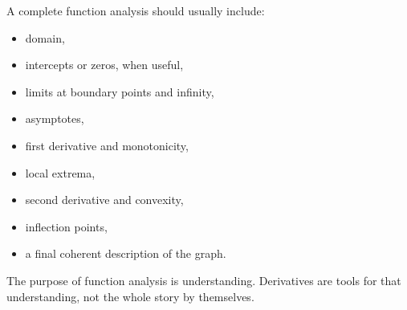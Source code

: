 \begin{summarybox}
A complete function analysis should usually include:
\begin{itemize}
\item domain,
\item intercepts or zeros, when useful,
\item limits at boundary points and infinity,
\item asymptotes,
\item first derivative and monotonicity,
\item local extrema,
\item second derivative and convexity,
\item inflection points,
\item a final coherent description of the graph.
\end{itemize}
\end{summarybox}

The purpose of function analysis is understanding. Derivatives are tools for that understanding, not the whole story by themselves.